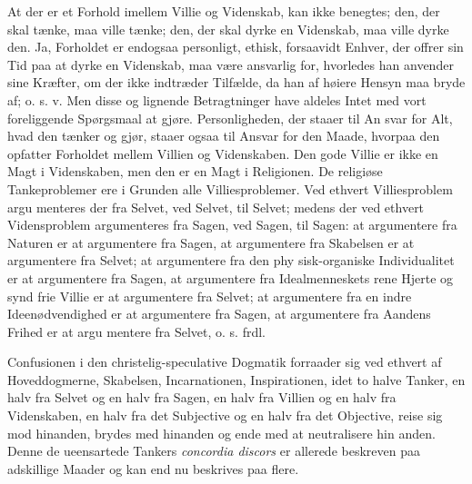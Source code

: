 \documentclass[12pt]{book}
\newcommand{\opage}[1]{\marginnote{\footnotesize\textit{[#1]}}}
\begin{document}
At der er et Forhold imellem Villie og Videnskab,
kan ikke benegtes; den, der skal tænke, maa ville tænke;
den, der skal dyrke en Videnskab, maa ville dyrke den.
Ja, Forholdet er endogsaa personligt, ethisk, forsaavidt
Enhver, der offrer sin Tid paa at dyrke en Videnskab,
maa være ansvarlig for, hvorledes han anvender sine
Kræfter, om der ikke indtræder Tilfælde, da han af høiere
Hensyn maa bryde af; o. s. v. Men disse og lignende
Betragtninger have aldeles Intet med vort foreliggende
Spørgsmaal at gjøre. Personligheden, der staaer til An\-%
svar for Alt, hvad den tænker og gjør, staaer ogsaa til
Ansvar for den Maade, hvorpaa den opfatter Forholdet
mellem Villien og Videnskaben. Den gode Villie er
ikke en Magt i Videnskaben, men den er en Magt i
Religionen. De religiøse Tankeproblemer ere i Grunden
alle Villiesproblemer. Ved ethvert Villiesproblem argu\-%
menteres der fra Selvet, ved Selvet, til Selvet; medens
der ved ethvert Vidensproblem argumenteres fra Sagen,
ved Sagen, til Sagen: at argumentere fra Naturen er at
argumentere fra Sagen, at argumentere fra Skabelsen er
at argumentere fra Selvet; at argumentere fra den phy\-%
sisk-organiske Individualitet er at argumentere fra Sagen,
at argumentere fra Idealmenneskets rene Hjerte og synd\-%
frie Villie er at argumentere fra Selvet; at argumentere
\opage{239}\setcounter{footnote}{0}%
fra en indre Ideenødvendighed er at argumentere fra
Sagen, at argumentere fra Aandens Frihed er at argu\-%
mentere fra Selvet, o. s. frdl.

Confusionen i den christelig-speculative Dogmatik
forraader sig ved ethvert af Hoveddogmerne, Skabelsen,
Incarnationen, Inspirationen, idet to halve Tanker, en
halv fra Selvet og en halv fra Sagen, en halv fra Villien
og en halv fra Videnskaben, en halv fra det Subjective
og en halv fra det Objective, reise sig mod hinanden,
brydes med hinanden og ende med at neutralisere hin\-%
anden. Denne de ueensartede Tankers \textit{concordia discors}
er allerede beskreven paa adskillige Maader og kan end\-%
nu beskrives paa flere.
\end{document}
